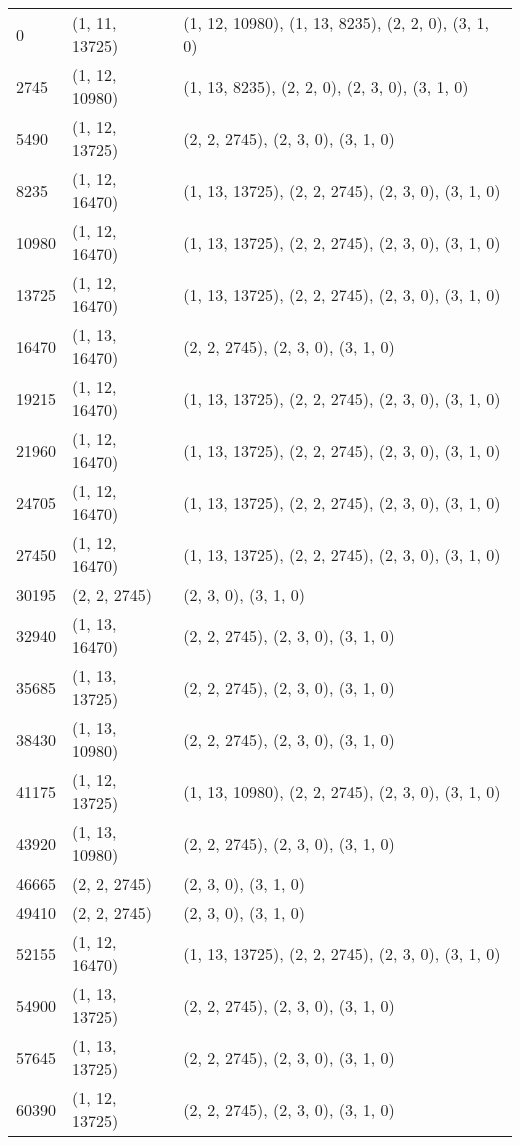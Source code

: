 \documentclass[notitlepage,openany]{book}
\begin{document}
\begin{center}
\begin{longtable}{|l|l|l|}
        0 & (1, 11, 13725) & (1, 12, 10980), (1, 13, 8235), (2, 2, 0), (3, 1, 0) \\
        2745 & (1, 12, 10980) & (1, 13, 8235), (2, 2, 0), (2, 3, 0), (3, 1, 0) \\
        5490 & (1, 12, 13725) & (2, 2, 2745), (2, 3, 0), (3, 1, 0) \\
        8235 & (1, 12, 16470) & (1, 13, 13725), (2, 2, 2745), (2, 3, 0), (3, 1, 0) \\
        10980 & (1, 12, 16470) & (1, 13, 13725), (2, 2, 2745), (2, 3, 0), (3, 1, 0) \\
        13725 & (1, 12, 16470) & (1, 13, 13725), (2, 2, 2745), (2, 3, 0), (3, 1, 0) \\
        16470 & (1, 13, 16470) & (2, 2, 2745), (2, 3, 0), (3, 1, 0) \\
        19215 & (1, 12, 16470) & (1, 13, 13725), (2, 2, 2745), (2, 3, 0), (3, 1, 0) \\
        21960 & (1, 12, 16470) & (1, 13, 13725), (2, 2, 2745), (2, 3, 0), (3, 1, 0) \\
        24705 & (1, 12, 16470) & (1, 13, 13725), (2, 2, 2745), (2, 3, 0), (3, 1, 0) \\
        27450 & (1, 12, 16470) & (1, 13, 13725), (2, 2, 2745), (2, 3, 0), (3, 1, 0) \\
        30195 & (2, 2, 2745) & (2, 3, 0), (3, 1, 0) \\
        32940 & (1, 13, 16470) & (2, 2, 2745), (2, 3, 0), (3, 1, 0) \\
        35685 & (1, 13, 13725) & (2, 2, 2745), (2, 3, 0), (3, 1, 0) \\
        38430 & (1, 13, 10980) & (2, 2, 2745), (2, 3, 0), (3, 1, 0) \\
        41175 & (1, 12, 13725) & (1, 13, 10980), (2, 2, 2745), (2, 3, 0), (3, 1, 0) \\
        43920 & (1, 13, 10980) & (2, 2, 2745), (2, 3, 0), (3, 1, 0) \\
        46665 & (2, 2, 2745) & (2, 3, 0), (3, 1, 0) \\
        49410 & (2, 2, 2745) & (2, 3, 0), (3, 1, 0) \\
        52155 & (1, 12, 16470) & (1, 13, 13725), (2, 2, 2745), (2, 3, 0), (3, 1, 0) \\
        54900 & (1, 13, 13725) & (2, 2, 2745), (2, 3, 0), (3, 1, 0) \\
        57645 & (1, 13, 13725) & (2, 2, 2745), (2, 3, 0), (3, 1, 0) \\
        60390 & (1, 12, 13725) & (2, 2, 2745), (2, 3, 0), (3, 1, 0) \\

\end{longtable}
\end{center}
\end{document}
